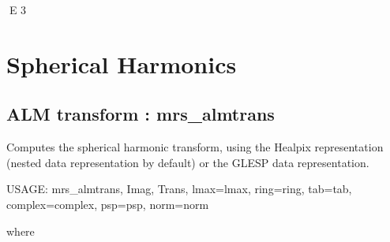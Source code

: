 E 3
\section{Spherical Harmonics}

\subsection{ALM transform : mrs\_almtrans}
Computes the spherical harmonic transform, using the Healpix representation (nested data representation by default) or the GLESP data representation.
{\bf
\begin{center}
     USAGE: mrs\_almtrans, Imag, Trans, lmax=lmax, ring=ring, tab=tab, complex=complex, psp=psp, norm=norm
\end{center}}
where
